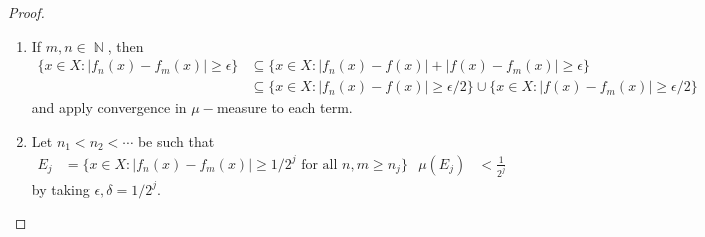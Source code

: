 \documentclass[11pt, a4paper]{memoir}
\DeclareMathOperator{\N}{{\mathbb{N}}}
\theoremstyle{change}
\theoremstyle{plain}
\theoremstyle{nonumberplain}
\newtheorem{proof}{Proof}
\numberwithin{equation}{section}
\begin{document}
\begin{proof}
    \begin{enumerate}[nolistsep,label=(\roman*)]
        \item If $m,n\in\N$, then
            \begin{align*}
                \{x\in X:|f_n(x)-f_m(x)|\geq\epsilon\}&\subseteq\{x\in X:|f_n(x)-f(x)|+|f(x)-f_m(x)|\geq\epsilon\}\\
                                                      &\subseteq\{x\in X:|f_n(x)-f(x)|\geq\epsilon/2\}\cup\{x\in X:|f(x)-f_m(x)|\geq\epsilon/2\}
            \end{align*}
            and apply convergence in $\mu-$measure to each term.
        \item Let $n_1<n_2<\cdots$ be such that
            \begin{align*}
                E_j&=\{x\in X:|f_n(x)-f_m(x)|\geq 1/2^j\text{ for all }n,m\geq n_j\}&\mu(E_j)&<\frac{1}{2^j}
            \end{align*}
            by taking $\epsilon,\delta=1/2^j$.


\end{enumerate}
\end{proof}
\end{document}

